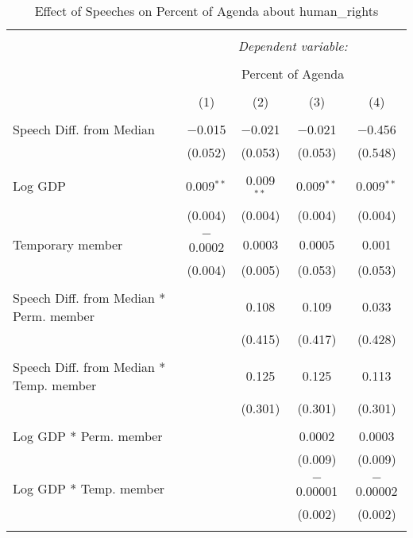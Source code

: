 
\begin{table}[!htbp] \centering 
  \caption{Effect of Speeches on Percent of Agenda about  human_rights} 
  \label{} 
\begin{tabular}{@{\extracolsep{5pt}}lcccc} 
\\[-1.8ex]\hline 
\hline \\[-1.8ex] 
 & \multicolumn{4}{c}{\textit{Dependent variable:}} \\ 
\cline{2-5} 
\\[-1.8ex] & \multicolumn{4}{c}{Percent of Agenda} \\ 
\\[-1.8ex] & (1) & (2) & (3) & (4)\\ 
\hline \\[-1.8ex] 
 Speech Diff. from Median & $-$0.015 & $-$0.021 & $-$0.021 & $-$0.456 \\ 
  & (0.052) & (0.053) & (0.053) & (0.548) \\ 
  & & & & \\ 
 Log GDP & 0.009$^{**}$ & 0.009$^{**}$ & 0.009$^{**}$ & 0.009$^{**}$ \\ 
  & (0.004) & (0.004) & (0.004) & (0.004) \\ 
  & & & & \\ 
 Temporary member & $-$0.0002 & 0.0003 & 0.0005 & 0.001 \\ 
  & (0.004) & (0.005) & (0.053) & (0.053) \\ 
  & & & & \\ 
 Speech Diff. from Median * Perm. member &  & 0.108 & 0.109 & 0.033 \\ 
  &  & (0.415) & (0.417) & (0.428) \\ 
  & & & & \\ 
 Speech Diff. from Median * Temp. member &  & 0.125 & 0.125 & 0.113 \\ 
  &  & (0.301) & (0.301) & (0.301) \\ 
  & & & & \\ 
 Log GDP * Perm. member &  &  & 0.0002 & 0.0003 \\ 
  &  &  & (0.009) & (0.009) \\ 
  & & & & \\ 
 Log GDP * Temp. member &  &  & $-$0.00001 & $-$0.00002 \\ 
  &  &  & (0.002) & (0.002) \\ 
  & & & & \\ 

\end{tabular}
\end{table}
